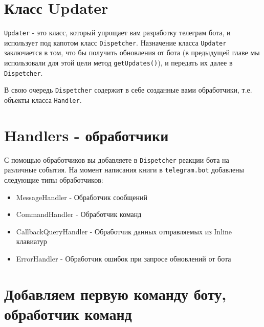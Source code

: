 \documentclass[
]{book}
\providecommand{\tightlist}{%
  \setlength{\itemsep}{0pt}\setlength{\parskip}{0pt}}
\begin{document}
\hypertarget{ux43aux43bux430ux441ux441-updater}{%
\section{Класс Updater}\label{ux43aux43bux430ux441ux441-updater}}

\texttt{Updater} - это класс, который упрощает вам разработку телеграм бота, и использует под капотом класс \texttt{Dispetcher}. Назначение класса \texttt{Updater} заключается в том, что бы получить обновления от бота (в предыдущей главе мы использовали для этой цели метод \texttt{getUpdates()}), и передать их далее в \texttt{Dispetcher}.

В свою очередь \texttt{Dispetcher} содержит в себе созданные вами обработчики, т.е. объекты класса \texttt{Handler}.

\hypertarget{handlers---ux43eux431ux440ux430ux431ux43eux442ux447ux438ux43aux438}{%
\section{Handlers - обработчики}\label{handlers---ux43eux431ux440ux430ux431ux43eux442ux447ux438ux43aux438}}

С помощью обработчиков вы добавляете в \texttt{Dispetcher} реакции бота на различные события. На момент написания книги в \texttt{telegram.bot} добавлены следующие типы обработчиков:

\begin{itemize}
\tightlist
\item
  MessageHandler - Обработчик сообщений
\item
  CommandHandler - Обработчик команд
\item
  CallbackQueryHandler - Обработчик данных отправляемых из Inline клавиатур
\item
  ErrorHandler - Обработчик ошибок при запросе обновлений от бота
\end{itemize}

\hypertarget{ux434ux43eux431ux430ux432ux43bux44fux435ux43c-ux43fux435ux440ux432ux443ux44e-ux43aux43eux43cux430ux43dux434ux443-ux431ux43eux442ux443-ux43eux431ux440ux430ux431ux43eux442ux447ux438ux43a-ux43aux43eux43cux430ux43dux434}{%
\section{Добавляем первую команду боту, обработчик команд}\label{ux434ux43eux431ux430ux432ux43bux44fux435ux43c-ux43fux435ux440ux432ux443ux44e-ux43aux43eux43cux430ux43dux434ux443-ux431ux43eux442ux443-ux43eux431ux440ux430ux431ux43eux442ux447ux438ux43a-ux43aux43eux43cux430ux43dux434}}
\end{document}
